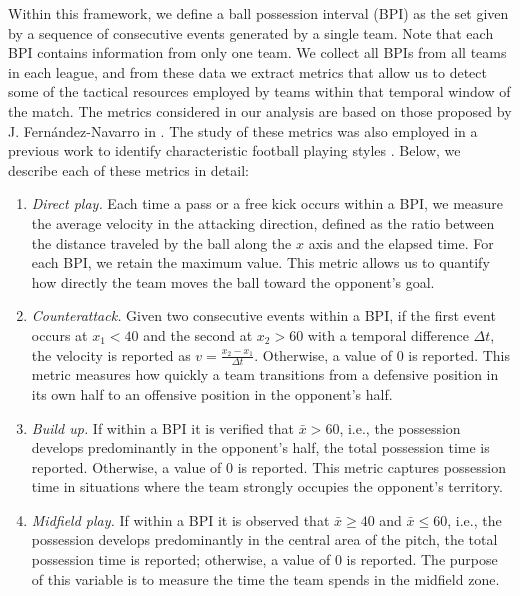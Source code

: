 \documentclass[preprint,12pt]{elsarticle}
\begin{document}
Within this framework, we define a ball possession interval (BPI) as the set given by a sequence of consecutive events generated by a single team. Note that each BPI contains information from only one team.  
We collect all BPIs from all teams in each league, and from these data we extract metrics that allow us to detect some of the tactical resources employed by teams within that temporal window of the match.  
The metrics considered in our analysis are based on those proposed by J. Fernández-Navarro in \cite{fernandez2018influence}. The study of these metrics was also employed in a previous work to identify characteristic football playing styles \cite{chacoma2025data}.  
Below, we describe each of these metrics in detail:

\begin{enumerate}
    \item {\it Direct play.} Each time a pass or a free kick occurs within a BPI, we measure the average velocity in the attacking direction, defined as the ratio between the distance traveled by the ball along the $x$ axis and the elapsed time. For each BPI, we retain the maximum value.  
    This metric allows us to quantify how directly the team moves the ball toward the opponent’s goal.

    \item {\it Counterattack.} Given two consecutive events within a BPI, if the first event occurs at $x_1<40$ and the second at $x_2>60$ with a temporal difference $\Delta t$, the velocity is reported as $v=\frac{x_2-x_1}{\Delta t}$. Otherwise, a value of $0$ is reported.  
    This metric measures how quickly a team transitions from a defensive position in its own half to an offensive position in the opponent’s half.

    \item {\it Build up.} If within a BPI it is verified that $\bar{x}>60$, i.e., the possession develops predominantly in the opponent’s half, the total possession time is reported. Otherwise, a value of $0$ is reported. This metric captures possession time in situations where the team strongly occupies the opponent’s territory.  

    \item {\it Midfield play.} If within a BPI it is observed that $\bar{x}\geq40$ and $\bar{x}\leq60$, i.e., the possession develops predominantly in the central area of the pitch, the total possession time is reported; otherwise, a value of $0$ is reported. The purpose of this variable is to measure the time the team spends in the midfield zone.


\end{enumerate}
\end{document}
